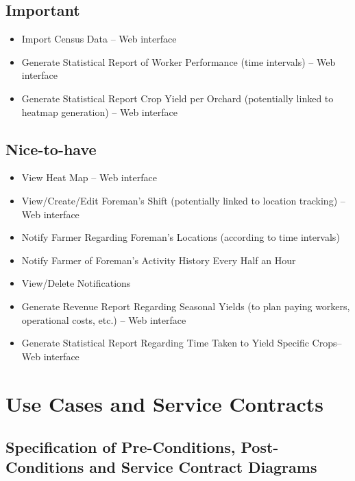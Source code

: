 \documentclass[11pt,fleqn]{book} %
\begin{document}
	\section{Important}
	\begin{itemize}
		\item Import Census Data – Web interface
		\item Generate Statistical Report of Worker Performance (time intervals) – Web interface
		\item Generate Statistical Report Crop Yield per Orchard (potentially linked to heatmap generation) – Web interface				
	\end{itemize}
	\section{Nice-to-have}
	\begin{itemize}
		\item View Heat Map – Web interface
		\item View/Create/Edit Foreman’s Shift (potentially linked to location tracking)  – Web interface
		\item Notify Farmer Regarding Foreman’s Locations (according to time intervals)
		\item Notify Farmer of Foreman’s Activity History Every Half an Hour
		\item View/Delete Notifications
		\item Generate Revenue Report Regarding Seasonal Yields (to plan paying workers, operational costs, etc.) – Web interface
		\item Generate Statistical Report Regarding Time Taken to Yield Specific Crops– Web interface
	\end{itemize}
	


\chapter{Use Cases and Service Contracts}
\section{Specification of Pre-Conditions, Post-Conditions and Service Contract Diagrams}
\end{document}
